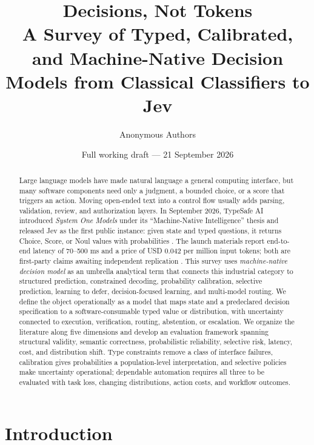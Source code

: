 \documentclass[11pt]{article}
\title{\textbf{Decisions, Not Tokens}\\\large A Survey of Typed, Calibrated, and Machine-Native Decision Models from Classical Classifiers to Jev}
\author{Anonymous Authors}
\date{Full working draft --- 21 September 2026}
\begin{document}
\maketitle

\begin{abstract}
Large language models have made natural language a general computing interface, but many software components need only a judgment, a bounded choice, or a score that triggers an action. Moving open-ended text into a control flow usually adds parsing, validation, review, and authorization layers. In September 2026, TypeSafe AI introduced \emph{System One Models} under its ``Machine-Native Intelligence'' thesis and released Jev as the first public instance: given state and typed questions, it returns Choice, Score, or Noul values with probabilities \cite{typesafe2026home,almeida2026jev,typesafe2026systemone,typesafe2026docs}. The launch materials report end-to-end latency of 70--500 ms and a price of USD 0.042 per million input tokens; both are first-party claims awaiting independent replication \cite{almeida2026jev}. This survey uses \emph{machine-native decision model} as an umbrella analytical term that connects this industrial category to structured prediction, constrained decoding, probability calibration, selective prediction, learning to defer, decision-focused learning, and multi-model routing. We define the object operationally as a model that maps state and a predeclared decision specification to a software-consumable typed value or distribution, with uncertainty connected to execution, verification, routing, abstention, or escalation. We organize the literature along five dimensions and develop an evaluation framework spanning structural validity, semantic correctness, probabilistic reliability, selective risk, latency, cost, and distribution shift. Type constraints remove a class of interface failures, calibration gives probabilities a population-level interpretation, and selective policies make uncertainty operational; dependable automation requires all three to be evaluated with task loss, changing distributions, action costs, and workflow outcomes.
\end{abstract}

\section{Introduction}
\end{document}
